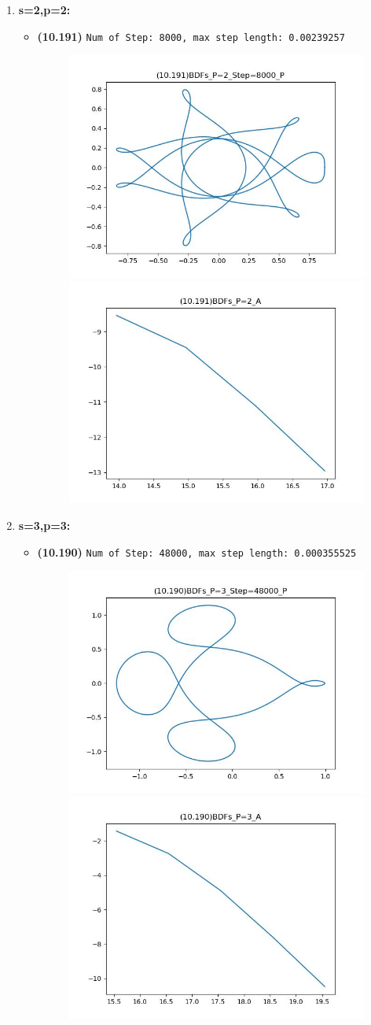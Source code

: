 \documentclass{article}
\begin{document}
\begin{enumerate}
    \item \textbf{s=2,p=2:}
    \begin{itemize}
        \item \textbf{(10.191)} \verb|Num of Step: 8000, max step length: 0.00239257|
        \begin{figure}[h]
            \centering
            \includegraphics[width = 0.45\linewidth]{(10.191)BDFs_P=2_Step=8000_P.jpg}
            \includegraphics[width = 0.45\linewidth]{(10.191)BDFs_P=2_A.jpg}
        \end{figure}
    \end{itemize}
    \item \textbf{s=3,p=3:}
    \begin{itemize}
        \item \textbf{(10.190)} \verb|Num of Step: 48000, max step length: 0.000355525|
        \begin{figure}[h]
            \centering
            \includegraphics[width = 0.45\linewidth]{(10.190)BDFs_P=3_Step=48000_P.jpg}
            \includegraphics[width = 0.45\linewidth]{(10.190)BDFs_P=3_A.jpg}

\end{figure}
\end{itemize}
\end{enumerate}
\end{document}
